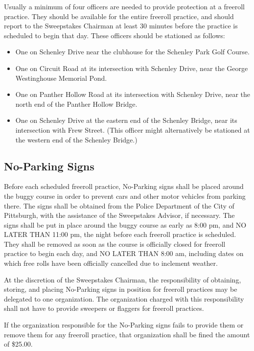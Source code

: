 \documentclass[openany]{book}
\begin{document}
Usually a minimum of four officers are needed to provide protection at a freeroll practice. They should be available for the entire freeroll practice, and should report to the Sweepstakes Chairman at least 30 minutes before the practice is scheduled to begin that day. These officers should be stationed as follows:
\begin{itemize}
	\item One on Schenley Drive near the clubhouse for the Schenley Park Golf Course.
	\item One on Circuit Road at its intersection with Schenley Drive, near the George Westinghouse Memorial Pond.
	\item One on Panther Hollow Road at its intersection with Schenley Drive, near the north end of the Panther Hollow Bridge.
	\item One on Schenley Drive at the eastern end of the Schenley Bridge, near its intersection with Frew Street. (This officer might alternatively be stationed at the western end of the Schenley Bridge.)
\end{itemize}

\subsection{No-Parking Signs}

Before each scheduled freeroll practice, No-Parking signs shall be placed around the buggy course in order to prevent cars and other motor vehicles from parking there. The signs shall be obtained from the Police Department of the City of Pittsburgh, with the assistance of the Sweepstakes Advisor, if necessary. The signs shall be put in place around the buggy course as early as 8:00 pm, and NO LATER THAN 11:00 pm, the night before each freeroll practice is scheduled. They shall be removed as soon as the course is officially closed for freeroll practice to begin each day, and NO LATER THAN 8:00 am, including dates on which free rolls have been officially cancelled due to inclement weather.

At the discretion of the Sweepstakes Chairman, the responsibility of obtaining, storing, and placing No-Parking signs in position for freeroll practices may be delegated to one organization. The organization charged with this responsibility shall not have to provide sweepers or flaggers for freeroll practices.

If the organization responsible for the No-Parking signs fails to provide them or remove them for any freeroll practice, that organization shall be fined the amount of \$25.00.
\end{document}
